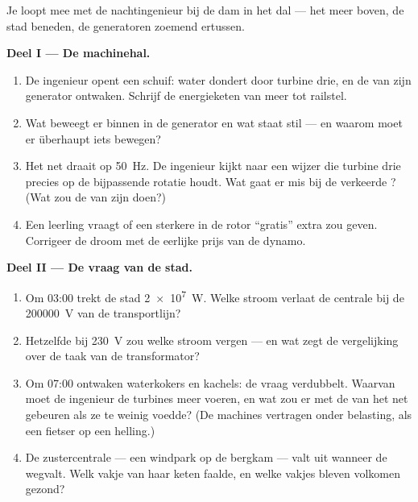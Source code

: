 \begin{problem}\label{pb:g9:alternator:1}
Je loopt mee met de nachtingenieur bij de dam in het dal ---
het meer boven, de stad beneden, de generatoren zoemend ertussen.

\medskip\noindent\textbf{Deel I --- De machinehal.}
\begin{enumerate}
  \item De ingenieur opent een schuif: water dondert door turbine
        drie, en de  van zijn generator ontwaken. Schrijf de
        energieketen van meer tot railstel.
  \item Wat beweegt er binnen in de generator en wat staat stil ---
        en waarom moet er überhaupt iets bewegen?
  \item Het net draait op \qty{50}{Hz}. De ingenieur kijkt naar een
        wijzer die turbine drie precies op de bijpassende rotatie
        houdt. Wat gaat er mis bij de verkeerde
        ? (Wat zou de  van zijn
         doen?)
  \item Een leerling vraagt of een sterkere  in de rotor
        ``gratis'' extra  zou geven. Corrigeer de droom met
        de eerlijke prijs van de dynamo.
\end{enumerate}

\medskip\noindent\textbf{Deel II --- De vraag van de stad.}
\begin{enumerate}[resume]
  \item Om 03:00 trekt de stad \qty{2e7}{W}. Welke stroom verlaat de
        centrale bij de \qty{200000}{V} van de transportlijn?
  \item Hetzelfde  bij \qty{230}{V} zou welke stroom
        vergen --- en wat zegt de vergelijking over de taak van de
        transformator?
  \item Om 07:00 ontwaken waterkokers en kachels: de vraag verdubbelt.
        Waarvan moet de ingenieur de turbines meer voeren, en wat zou
        er met de  van het net gebeuren als ze te
        weinig voedde? (De machines vertragen onder belasting, als een
        fietser op een helling.)
  \item De zustercentrale --- een windpark op de bergkam --- valt uit
        wanneer de  wegvalt. Welk vakje van haar keten faalde,
        en welke vakjes bleven volkomen gezond?
\end{enumerate}


\end{problem}
